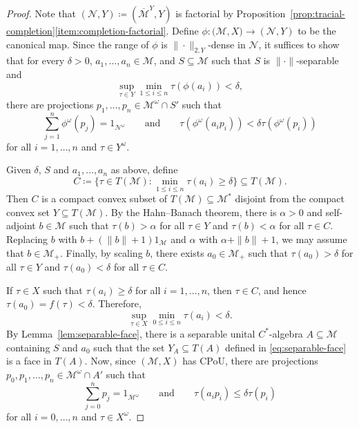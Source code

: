 \documentclass[a4paper,11pt]{amsart}
\theoremstyle{definition}
\numberwithin{equation}{section}
\numberwithin{theorem}{section}
\newcommand{\M}{\mathcal{M}}
\newcommand{\completion}[2]{\overline{#1}^{#2}}
\begin{document}
\begin{proof}
	Note that $(\mathcal N, Y) \coloneqq (\completion{\mathcal M}{Y}, Y)$ is factorial by Proposition~\ref{prop:tracial-completion}\ref{item:completion-factorial}. Define $\phi \colon \mathcal (\mathcal M, X) \rightarrow (\mathcal N, Y)$ to be the canonical map.  Since the range of $\phi$ is $\|\cdot\|_{2, Y}$-dense in $\mathcal N$, it suffices to show that for every $\delta > 0$, $a_1, \ldots, a_n \in \mathcal M$, and $S \subseteq \mathcal M$ such that $S$ is $\|\cdot\|$-separable and
	\begin{equation} \sup_{\tau \in Y} \min_{1 \leq i \leq n} \tau(\phi(a_i)) < \delta,
	\end{equation}
	there are projections $p_1, \ldots, p_n \in \mathcal M^\omega \cap S'$ such that 
	\begin{equation}\label{eq:CPoU-condition}
		\sum_{j=1}^n \phi^\omega(p_j) = 1_\mathcal {N^\omega} \qquad \text{and} \qquad \tau(\phi^\omega(a_i p_i)) < \delta \tau(\phi^\omega(p_i))
	\end{equation}
	for all $i = 1, \ldots, n$ and $\tau \in Y^\omega$.
	
	Given $\delta$, $S$ and  $a_1,\ldots,a_n$ as above, define
	\begin{equation}\label{eq:CPoU-quotient}
		C \coloneqq \{ \tau \in T(\mathcal M) : \min_{1 \leq i \leq n} \tau(a_i) \geq \delta \} \subseteq T(\mathcal M).
	\end{equation}
	Then $C$ is a compact convex subset of $T(\mathcal M)\subseteq \mathcal M^*$ disjoint from the compact convex set $Y \subseteq T(\mathcal M)$.  
	By the Hahn--Banach theorem, there is $\alpha > 0$ and self-adjoint $b \in \M$ such that $\tau(b) > \alpha$ for all $\tau \in Y$ and $\tau(b) < \alpha$ for all $\tau \in C$. Replacing $b$ with $b + (\|b\|+1)1_\M$ and $\alpha$ with $\alpha + \|b\|+1$, we may assume that $b \in \M_+$.  Finally, by scaling $b$, there exists $a_0 \in \M_+$ such that $\tau(a_0) > \delta$ for all $\tau \in Y$ and $\tau(a_0) < \delta$ for all $\tau \in C$.
	
	If $\tau \in X$ such that $\tau(a_i) \geq \delta$ for all $i = 1, \ldots, n$, then $\tau \in C$, and hence $\tau(a_0) = f(\tau) < \delta$.  Therefore, 
	\begin{equation}
		\sup_{\tau \in X} \min_{0 \leq i \leq n} \tau(a_i) < \delta.
	\end{equation}
	By Lemma~\ref{lem:separable-face}, there is a separable unital $C^*$-algebra $A \subseteq \mathcal M$ containing $S$ and $a_0$ such that the set $Y_A \subseteq T(A)$ defined in \eqref{eq:separable-face} is a face in $T(A)$.  Now, since $(\mathcal M, X)$ has CPoU, there are projections $p_0, p_1, \ldots, p_n \in \mathcal M^\omega \cap A'$ such that
	\begin{equation}\label{eq:cpou-extension}
		\sum_{j=0}^n p_j = 1_\mathcal {M^\omega} \qquad \text{and} \qquad \tau(a_i p_i) \leq \delta \tau(p_i)
	\end{equation}
	for all $i = 0, \ldots, n$ and $\tau \in X^\omega$.
	

\end{proof}
\end{document}

